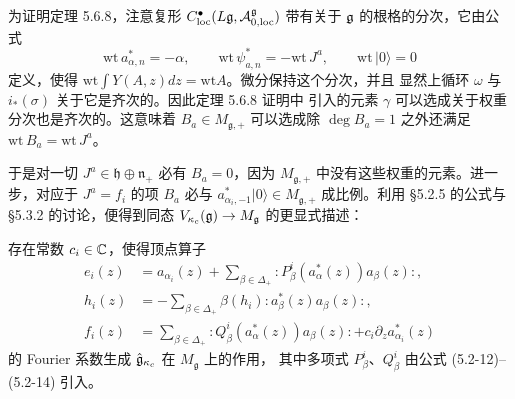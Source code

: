为证明定理 5.6.8，注意复形 $C^\bullet_{\mathrm{loc}}(L\mathfrak{g},
\mathcal{A}^{\mathfrak g}_{0,\mathrm{loc}})$ 带有关于 $\mathfrak{g}$ 的根格的分次，它由公式
\[
    \mathrm{wt}\,a^*_{\alpha,n}=-\alpha,\qquad
    \mathrm{wt}\,\psi^*_{a,n}=-\mathrm{wt}\,J^a,\qquad
    \mathrm{wt}\,|0\rangle=0
\]
定义，使得 $\mathrm{wt}\int Y(A,z)dz=\mathrm{wt}A$。微分保持这个分次，并且
显然上循环 $\omega$ 与 $i_*(\sigma)$ 关于它是齐次的。因此定理 5.6.8 证明中
引入的元素 $\gamma$ 可以选成关于权重分次也是齐次的。这意味着 $B_a\in
M_{\mathfrak g,+}$ 可以选成除 $\deg B_a=1$ 之外还满足
$\mathrm{wt}\,B_a=\mathrm{wt}\,J^a$。

于是对一切 $J^a\in\mathfrak h\oplus\mathfrak n_+$ 必有 $B_a=0$，因为
$M_{\mathfrak g,+}$ 中没有这些权重的元素。进一步，对应于 $J^a=f_i$ 的项
$B_a$ 必与 $a^*_{\alpha_i,-1}|0\rangle\in M_{\mathfrak g,+}$ 成比例。利用
\S5.2.5 的公式与 \S5.3.2 的讨论，便得到同态
$V_{\kappa_c}(\mathfrak{g})\to M_{\mathfrak g}$ 的更显式描述：

\renewcommand{\thetheorem}{6.1.3}
\begin{theorem}
    存在常数 $c_i\in\mathbb{C}$，使得顶点算子
    \[
        \begin{aligned}
            e_i(z)&=a_{\alpha_i}(z)+\sum_{\beta\in\Delta_+}
            :\!P^i_\beta(a^*_\alpha(z))a_\beta(z)\!:,\\
            h_i(z)&=-\sum_{\beta\in\Delta_+}
            \beta(h_i):\!a^*_\beta(z)a_\beta(z)\!:,\\
            f_i(z)&=\sum_{\beta\in\Delta_+}
            :\!Q^i_\beta(a^*_\alpha(z))a_\beta(z)\!:
            +c_i\partial_za^*_{\alpha_i}(z)
        \end{aligned}
    \]
    的 Fourier 系数生成 $\hat{\mathfrak{g}}_{\kappa_c}$ 在 $M_{\mathfrak g}$ 上的作用，
    其中多项式 $P^i_\beta$、$Q^i_\beta$ 由公式 (5.2-12)--(5.2-14) 引入。
\end{theorem}

